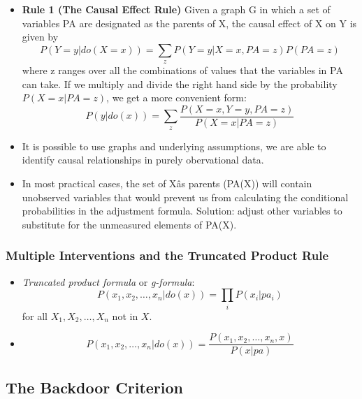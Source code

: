 \documentclass[]{article}
\begin{document}
\begin{itemize}
\item
  \textbf{Rule 1 (The Causal Effect Rule)} Given a graph G in which a
  set of variables PA are designated as the parents of X, the causal
  effect of X on Y is given by \[
  P(Y = y|do(X = x)) = \sum_z P(Y = y|X = x, PA = z)P(PA = z)
  \] where z ranges over all the combinations of values that the
  variables in PA can take. If we multiply and divide the right hand
  side by the probability \(P(X = x|PA = z)\), we get a more convenient
  form: \[
  P(y|do(x)) = \sum_z \frac{P(X = x, Y = y, PA = z)}{P(X = x|PA = z)}
  \]
\item
  It is possible to use graphs and underlying assumptions, we are able
  to identify causal relationships in purely obervational data.
\item
  In most practical cases, the set of Xâs parents (PA(X)) will contain
  unobserved variables that would prevent us from calculating the
  conditional probabilities in the adjustment formula. Solution: adjust
  other variables to substitute for the unmeasured elements of PA(X).
\end{itemize}

\subsubsection{Multiple Interventions and the Truncated Product
Rule}\label{multiple-interventions-and-the-truncated-product-rule}

\begin{itemize}
\item
  \emph{Truncated product formula} or \emph{g-formula}: \[
  P(x_1, x_2, \dots, x_n|do(x)) = \prod_i P(x_i|pa_i)
  \] for all \(X_1, X_2, \dots, X_n\) not in \(X\).
\item
  \[ P(x_1, x_2, \dots, x_n|do(x)) = \frac{P(x_1, x_2, \dots, x_n, x)}{P(x|pa)} 
  \]
\end{itemize}

\subsection{The Backdoor Criterion}\label{the-backdoor-criterion}
\end{document}

